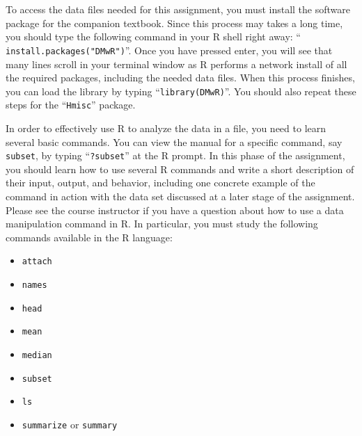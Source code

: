 To access the data files needed for this assignment, you must install the software package for the companion textbook.
Since this process may takes a long time, you should type the following command in your R shell right away: ``{\tt
  install.packages("DMwR")}''. Once you have pressed enter, you will see that many lines scroll in your terminal window
as R performs a network install of all the required packages, including the needed data files.  When this process
finishes, you can load the library by typing ``{\tt library(DMwR)}''. You should also repeat these steps for the
``{\tt Hmisc}'' package.

In order to effectively use R to analyze the data in a file, you need to learn several basic commands. You can view the
manual for a specific command, say {\tt subset}, by typing ``{\tt ?subset}'' at the R prompt. In this phase of the
assignment, you should learn how to use several R commands and write a short description of their input, output, and
behavior, including one concrete example of the command in action with the data set discussed at a later stage of the
assignment. Please see the course instructor if you have a question about how to use a data manipulation command in R.
In particular, you must study the following commands available in the R language:

\begin{itemize}
    \itemsep.1in
  \item {\tt attach}
  \item {\tt names}
  \item {\tt head}
  \item {\tt mean}
  \item {\tt median}
  \item {\tt subset}
  \item {\tt ls}
  \item {\tt summarize} or {\tt summary}
\end{itemize}


